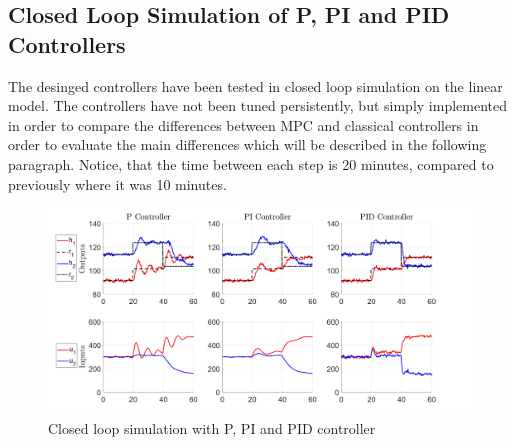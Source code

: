 \subsection{Closed Loop Simulation of P, PI and PID Controllers}
The desinged controllers have been tested in closed loop simulation on the linear model. The controllers have not been tuned persistently, but simply implemented in order to compare the differences between MPC and classical controllers in order to evaluate the main differences which will be described in the following paragraph. Notice, that the time between each step is 20 minutes, compared to previously where it was 10 minutes. 
\begin{figure}[H]
    \centering
    \includegraphics[width=1\textwidth]{Figures/Pr13_Control.png}
    \caption{Closed loop simulation with P, PI and PID controller}
\end{figure}